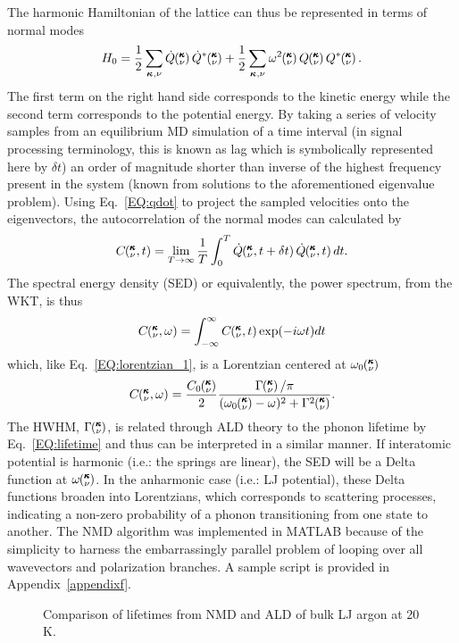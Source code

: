 %
The harmonic Hamiltonian of the lattice can thus be represented in terms of normal modes
%
\begin{equation}
H_0=\frac{1}{2}\sum_{\bm{\kappa},\nu}\dot{Q}\kv\dot{Q}^*\kv+\frac{1}{2}\sum_{\bm{\kappa},\nu}\omega^2\kv Q\kv Q^*\kv.
\end{equation}
%
The first term on the right hand side corresponds to the kinetic energy while the second term corresponds to the potential energy. By taking a series of velocity samples from an equilibrium MD simulation of a time interval (in signal processing terminology, this is known as lag which is symbolically represented here by $\delta t$) an order of magnitude shorter than inverse of the highest frequency present in the system (known from solutions to the aforementioned eigenvalue problem). Using Eq.~\ref{EQ:qdot} to project the sampled velocities onto the eigenvectors, the autocorrelation of the normal modes can calculated by
%
\begin{equation}\label{EQ:corrqdot}
C\kvt=\lim_{T \rightarrow \infty}\frac{1}{T}\int_{0}^{T}\dot{Q}\kvtt \dot{Q}\kvt dt.
\end{equation}
%
The spectral energy density (SED) or equivalently, the power spectrum, from the WKT, is thus
%
\begin{equation}\label{EQ:NMD:SED}
C\mspace{-4.0mu}\left(\mspace{-8.0mu} \begin{smallmatrix}&\pmb{\kappa} \\&\nu\end{smallmatrix} \mspace{-2.0mu},\omega\right)=\int_{-\infty}^{\infty}C\mspace{-4.0mu}\left(\mspace{-8.0mu} \begin{smallmatrix}&\pmb{\kappa} \\&\nu\end{smallmatrix} \mspace{-2.0mu},t\right) \exp(-i\omega t)dt
\end{equation}
%
which, like Eq.~\ref{EQ:lorentzian_1}, is a Lorentzian centered at $\omega_0\mspace{-4.0mu}\left(\mspace{-8.0mu} \begin{smallmatrix}&\pmb{\kappa} \\&\nu\end{smallmatrix} \mspace{-3.0mu}\right)$
%
\begin{equation}\label{EQ:NMD:LOR}
C\kvw=\frac{C_0\kv}{2}\frac{\Gamma\kv/\pi}{(\omega_0\kv-\omega)^2+\Gamma^2\kv}.
\end{equation}
%
The HWHM, $\Gamma\mspace{-4.0mu}\left(\mspace{-8.0mu} \begin{smallmatrix}&\pmb{\kappa} \\&\nu\end{smallmatrix} \mspace{-3.0mu}\right)$, is related through ALD theory \cite{PhysRev.128.2589} to the phonon lifetime by Eq.~\ref{EQ:lifetime} and thus can be interpreted in a similar manner. If interatomic potential is harmonic (i.e.: the springs are linear), the SED will be a Delta function at $\omega\mspace{-4.0mu}\left(\mspace{-8.0mu} \begin{smallmatrix}&\pmb{\kappa} \\&\nu\end{smallmatrix} \mspace{-3.0mu}\right)$. In the anharmonic case (i.e.: LJ potential), these Delta functions broaden into Lorentzians, which corresponds to scattering processes, indicating a non-zero probability of a phonon transitioning from one state to another.
The NMD algorithm was implemented in MATLAB because of the simplicity to harness the embarrassingly parallel problem of looping over all wavevectors and polarization branches. A sample script is provided in Appendix~\ref{appendixf}.

\begin{figure}[t!]
\begin{center}
\renewcommand{\figure}{Fig.}
\caption{Comparison of lifetimes from NMD and ALD of bulk LJ argon at 20 K.}
\label{FIG:NMD_v_ALD}
\end{center}
\end{figure}

